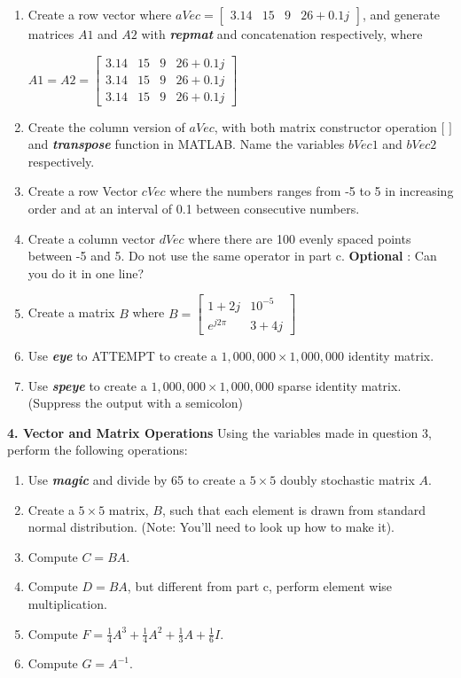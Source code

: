 \documentclass[11pt]{article}
\newenvironment{qparts}{\begin{enumerate}[{(}a{)}]}{\end{enumerate}}
\begin{document}
\begin{qparts}
\item
Create a row vector where $ aVec = \begin{bmatrix}3.14&15&9&26+0.1j\end{bmatrix}$, 
and generate matrices $A1$ and $A2$ with \textbf{\textit{repmat}} and concatenation respectively, where 

$A1 = A2 = \begin{bmatrix}3.14&15&9& 26+0.1j \\ 3.14&15&9&26+0.1j\\3.14&15&9&26+0.1j\end{bmatrix}$ 

\item
Create the column version of $aVec$, with both matrix constructor operation $[$ $]$ and 
\textbf{\textit{transpose}} function in MATLAB. 
Name the variables $bVec1$ and $bVec2$ respectively.    
\item  
Create a row Vector $cVec$ where the numbers ranges from -5 to 5 in increasing order 
and at an interval of 0.1 between consecutive numbers. 
\item
Create a column vector $dVec$ where there are 100 evenly spaced points between -5 and 5. 
Do not use the same operator in part c. \textbf{Optional} : Can you do it in one line?
\item
Create a matrix $B$ where $B = \begin{bmatrix} 1+2j&10^{-5}\\ e^{j2\pi}&3+4j \end{bmatrix}$
\item 
Use \textbf{\textit{eye}} to ATTEMPT to create a $1,000,000 \times 1,000,000$ identity matrix.
\item
Use \textbf{\textit{speye}} to create a $1,000,000 \times 1,000,000$ sparse identity matrix. 
(Suppress the output with a semicolon)
\end{qparts}


\noindent \textbf{4. Vector and Matrix Operations} Using the variables made in question 3, 
perform the following operations:
\begin{qparts}
\item
Use \textbf{\textit{magic}} and divide by 65 to create a $5 \times 5$ doubly stochastic matrix $A$.
\item
Create a $5 \times 5$ matrix, $B$, such that each element is drawn from standard normal
distribution. (Note: You'll need to look up how to make it).
\item
Compute $C = BA$.
\item
Compute $D = BA$, but different from part c, perform element wise multiplication.
\item
Compute $F = \frac{1}{4}A^3 + \frac{1}{4}A^2 + \frac{1}{3}A + \frac{1}{6}I$. 
\item
Compute $G = A^{-1}$.
\end{qparts}
\end{document}

